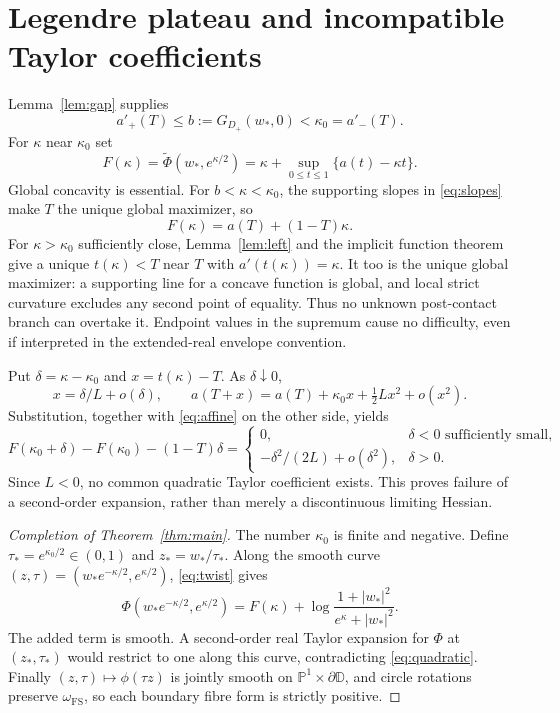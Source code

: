 \documentclass[11pt]{article}
\newcommand{\Pone}{\mathbb P^1}
\newcommand{\D}{\mathbb D}
\newcommand{\FS}{\omega_{\mathrm{FS}}}
\begin{document}
\section{Legendre plateau and incompatible Taylor coefficients}
Lemma~\ref{lem:gap} supplies
\begin{equation}\label{eq:slopes}
 a'_+(T)\leq b:=G_{D_+}(w_*,0)<\kappa_0=a'_-(T).
\end{equation}
For $\kappa$ near $\kappa_0$ set
\[
 F(\kappa)=\widetilde\Phi(w_*,e^{\kappa/2})
 =\kappa+\sup_{0\leq t\leq1}\{a(t)-\kappa t\}.
\]
Global concavity is essential. For $b<\kappa<\kappa_0$, the supporting
slopes in \eqref{eq:slopes} make $T$ the unique global maximizer, so
\begin{equation}\label{eq:affine}
 F(\kappa)=a(T)+(1-T)\kappa.
\end{equation}
For $\kappa>\kappa_0$ sufficiently close, Lemma~\ref{lem:left} and the
implicit function theorem give a unique $t(\kappa)<T$ near $T$ with
$a'(t(\kappa))=\kappa$. It too is the unique global maximizer: a supporting
line for a concave function is global, and local strict curvature excludes
any second point of equality. Thus no unknown post-contact branch can
overtake it. Endpoint values in the supremum cause no difficulty, even
if interpreted in the extended-real envelope convention.

Put $\delta=\kappa-\kappa_0$ and $x=t(\kappa)-T$. As $\delta\downarrow0$,
\[
 x=\delta/L+o(\delta),\qquad
 a(T+x)=a(T)+\kappa_0x+\tfrac12Lx^2+o(x^2).
\]
Substitution, together with \eqref{eq:affine} on the other side, yields
\begin{equation}\label{eq:quadratic}
 F(\kappa_0+\delta)-F(\kappa_0)-(1-T)\delta
 =\begin{cases}
 0,&\delta<0\text{ sufficiently small},\\[2pt]
 -\delta^2/(2L)+o(\delta^2),&\delta>0.
 \end{cases}
\end{equation}
Since $L<0$, no common quadratic Taylor coefficient exists. This proves
failure of a second-order expansion, rather than merely a discontinuous
limiting Hessian.

\begin{proof}[Completion of Theorem~\ref{thm:main}]
The number $\kappa_0$ is finite and negative. Define
$\tau_*=e^{\kappa_0/2}\in(0,1)$ and $z_*=w_*/\tau_*$.
Along the smooth curve $(z,\tau)=(w_*e^{-\kappa/2},e^{\kappa/2})$,
\eqref{eq:twist} gives
\[
 \Phi(w_*e^{-\kappa/2},e^{\kappa/2})
 =F(\kappa)+\log\frac{1+|w_*|^2}{e^\kappa+|w_*|^2}.
\]
The added term is smooth. A second-order real Taylor expansion for $\Phi$
at $(z_*,\tau_*)$ would restrict to one along this curve, contradicting
\eqref{eq:quadratic}. Finally $(z,\tau)\mapsto\phi(\tau z)$ is jointly
smooth on $\Pone\times\partial\D$, and circle rotations preserve $\FS$,
so each boundary fibre form is strictly positive.
\end{proof}
\end{document}
